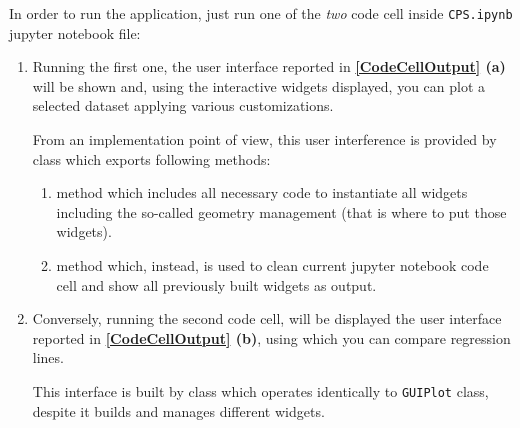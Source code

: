 \documentclass[sigconf]{acmart}
\begin{document}
In order to run the application, just run one of the \textit{two} code cell inside \texttt{CPS.ipynb} jupyter notebook file:

\begin{enumerate}
\item Running the first one, the user interface reported in \textbf{\cref{CodeCellOutput} (a)} will be shown and, using the interactive widgets displayed, you can plot a selected dataset applying various customizations.

From an implementation point of view, this user interference is provided by  class which exports following methods: 

\begin{enumerate}
\item {} method which includes all necessary code to instantiate all widgets including the so-called geometry management (that is where to put those widgets).

\item {} method which, instead, is used to clean current jupyter notebook code cell and show all previously built widgets as output.
\end{enumerate}

\item Conversely, running the second code cell, will be displayed the user interface reported in \textbf{\cref{CodeCellOutput} (b)}, using which you can compare regression lines. 

This interface is built by  class which operates identically to \texttt{GUIPlot} class, despite it builds and manages different widgets.

\end{enumerate}
\end{document}

